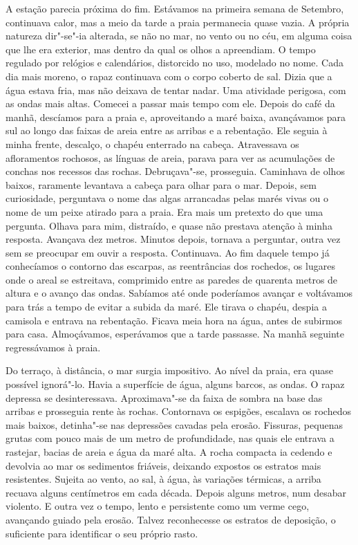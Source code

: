 A estação parecia próxima do fim. Estávamos na primeira semana de
Setembro, continuava calor, mas a meio da tarde a praia permanecia quase
vazia. A própria natureza dir"-se"-ia alterada, se não no mar, no vento
ou no céu, em alguma coisa que lhe era exterior, mas dentro da qual os
olhos a apreendiam. O tempo regulado por relógios e calendários,
distorcido no uso, modelado no nome. Cada dia mais moreno, o rapaz
continuava com o corpo coberto de sal. Dizia que a água estava fria, mas
não deixava de tentar nadar. Uma atividade perigosa, com as ondas mais
altas. Comecei a passar mais tempo com ele. Depois do café da manhã,
descíamos para a praia e, aproveitando a maré baixa, avançávamos para
sul ao longo das faixas de areia entre as arribas e a rebentação. Ele
seguia à minha frente, descalço, o chapéu enterrado na cabeça.
Atravessava os afloramentos rochosos, as línguas de areia, parava para
ver as acumulações de conchas nos recessos das rochas. Debruçava"-se,
prosseguia. Caminhava de olhos baixos, raramente levantava a cabeça para
olhar para o mar. Depois, sem curiosidade, perguntava o nome das algas
arrancadas pelas marés vivas ou o nome de um peixe atirado para a praia.
Era mais um pretexto do que uma pergunta. Olhava para mim, distraído, e
quase não prestava atenção à minha resposta. Avançava dez metros.
Minutos depois, tornava a perguntar, outra vez sem se preocupar em ouvir
a resposta. Continuava. Ao fim daquele tempo já conhecíamos o contorno
das escarpas, as reentrâncias dos rochedos, os lugares onde o areal se
estreitava, comprimido entre as paredes de quarenta metros de altura e o
avanço das ondas. Sabíamos até onde poderíamos avançar e voltávamos para
trás a tempo de evitar a subida da maré. Ele tirava o chapéu, despia a
camisola e entrava na rebentação. Ficava meia hora na água, antes de
subirmos para casa. Almoçávamos, esperávamos que a tarde passasse. Na
manhã seguinte regressávamos à praia.

Do terraço, à distância, o mar surgia impositivo. Ao nível da praia, era
quase possível ignorá"-lo. Havia a superfície de água, alguns barcos, as
ondas. O rapaz depressa se desinteressava. Aproximava"-se da faixa de
sombra na base das arribas e prosseguia rente às rochas. Contornava os
espigões, escalava os rochedos mais baixos, detinha"-se nas depressões
cavadas pela erosão. Fissuras, pequenas grutas com pouco mais de um
metro de profundidade, nas quais ele entrava a rastejar, bacias de areia
e água da maré alta. A rocha compacta ia cedendo e devolvia ao mar os
sedimentos friáveis, deixando expostos os estratos mais resistentes.
Sujeita ao vento, ao sal, à água, às variações térmicas, a arriba
recuava alguns centímetros em cada década. Depois alguns metros, num
desabar violento. E outra vez o tempo, lento e persistente como um verme
cego, avançando guiado pela erosão. Talvez reconhecesse os estratos de
deposição, o suficiente para identificar o seu próprio rasto.


